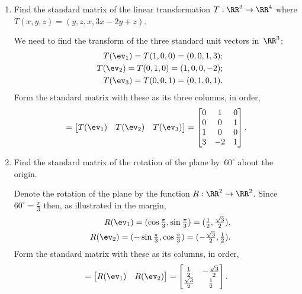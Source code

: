 \begin{example} \label{eg:stmatlt}
\begin{enumerate}
\item Find the standard matrix of the linear transformation \(T:\RR^3\to\RR^4\) where \(T(x,y,z)=(y,z,x,3x-2y+z)\).
\begin{solution} 
We need to find the transform of the three standard unit vectors in~\(\RR^3\):
\begin{eqnarray*}
&&T(\ev_1)=T(1,0,0)=(0,0,1,3);
\\&&T(\ev_2)=T(0,1,0)=(1,0,0,-2);
\\&&T(\ev_3)=T(0,0,1)=(0,1,0,1).
\end{eqnarray*}
Form the standard matrix with these as its three columns, in order,
\begin{equation*}
[T]=\begin{bmatrix} T(\ev_1)&T(\ev_2)&T(\ev_3) \end{bmatrix}
=\begin{bmatrix} 0&1&0\\0&0&1\\1&0&0\\ 3&-2&1\end{bmatrix}.
\end{equation*}
\end{solution}

\item\label{eg:stmatlt:b} Find the standard matrix of the rotation of the plane by~\(60^\circ\) about the origin.
\begin{solution} 
Denote the rotation of the plane by the function \(R:\RR^2\to\RR^2\).
Since \(60^\circ=\frac\pi3\) then, as illustrated in the margin,
%
\begin{eqnarray*}
&&R(\ev_1)=(\cos\tfrac\pi3,\sin\tfrac\pi3)
=(\tfrac12,\tfrac{\sqrt3}2),
\\&&R(\ev_2)=(-\sin\tfrac\pi3,\cos\tfrac\pi3)
=(-\tfrac{\sqrt3}2,\tfrac12).
\end{eqnarray*}
Form the standard matrix with these as its columns, in order,
\begin{equation*}
[R]=\begin{bmatrix} R(\ev_1)&R(\ev_2) \end{bmatrix}
=\begin{bmatrix} \frac12&-\frac{\sqrt3}2
\\\frac{\sqrt3}2&\frac12 \end{bmatrix}.
\end{equation*}
\end{solution}


\end{enumerate}
\end{example}
